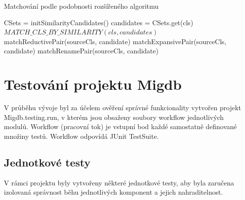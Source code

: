 \documentclass[11pt,twoside,a4paper]{book}
\begin{document}
\FloatBarrier
 
\begin{algorithm}
 \caption{Matchování podle podobnosti rozšířeného
 algoritmu}\label{algo:matching_ext:match_similarity}
 \begin{algorithmic}[1]
    \State CSets = initSimilarityCandidates() 
          \State candidates = CSets.get(cls)
          \State $MATCH\_CLS\_BY\_SIMILARITY(cls, candidates)$
       \EndFor
    \EndFor
 \EndProcedure
 \Statex
 	         \State {}\label{algo:matching_ext:modifying
 	         operation}
 	      \Else
 	         \State matchReductivePair(sourceCls, candidate)
 	         \label{algo:matching_ext:reductive_pair}
 	      \EndIf
 	   \Else
 	         \State matchExpansivePair(sourceCls,
 	         candidate)\label{algo:matching_ext:expansive_pair}
 	      \Else
 	         \State matchRenamePair(sourceCls,
 	         candidate)\label{algo:matching_ext:rename_pair}
 	      \EndIf
 	   \EndIf 
 	\EndFor
 \EndProcedure
 \end{algorithmic}
\end{algorithm}

\FloatBarrier


\chapter{Testování projektu Migdb}\label{chapt:testování}

V průběhu vývoje byl za účelem ověření správné funkcionality vytvořen projekt
Migdb.testing.run, v kterém jsou obsaženy soubory workflow jednotlivých modulů.
Workflow (pracovní tok) je vstupní bod každé samostatně definované množiny
testů. Workflow odpovídá JUnit TestSuite.

\section{Jednotkové testy}
V rámci projektu byly vytvořeny některé jednotkové testy, aby byla zaručena
izolovaná správnost běhu jednotlivých komponent a jejich nahraditelnost.
\end{document}
